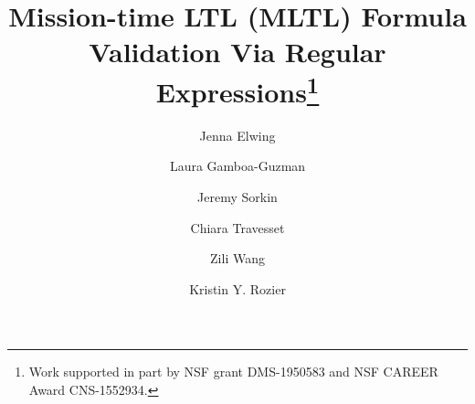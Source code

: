 \documentclass[runningheads]{llncs}
\begin{document}
%
\title{Mission-time LTL (MLTL) Formula Validation Via Regular Expressions\thanks{Work supported in part by NSF grant DMS-1950583 and NSF CAREER Award CNS-1552934.}}
%
%


\author{Jenna Elwing\and
Laura Gamboa-Guzman \and
Jeremy Sorkin \and Chiara Travesset\and Zili Wang \and Kristin Y. Rozier}
%

\maketitle
\vspace{-0.3in}
\end{document}
